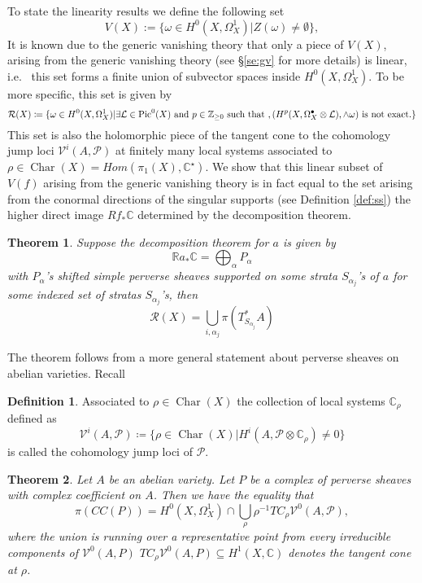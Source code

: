 \documentclass[11pt,reqno]{amsart}
\newtheorem{theorem}{Theorem}[section]
\newtheorem{alphtheorem}{Theorem}
\theoremstyle{definition}
\newtheorem{definition}[theorem]{Definition}
\theoremstyle{remark}
\theoremstyle{cited}
\theoremstyle{citeddef}
\DeclareMathOperator{\Char}{Char}
\def\Pic{{\rm Pic}}
\newcommand{\sL}{\mathcal{L}}
\newcommand{\sP}{\mathcal{P}}
\newcommand{\sR}{\mathcal{R}}
\newcommand\sV{{\mathcal V}}
\newcommand{\bbC}{\mathbb{C}}
\newcommand{\bbR}{\mathbb{R}}
\newcommand{\bbZ}{\mathbb{Z}}
\begin{document}
To state the linearity results we define
the following set
\[V(X):=\{ \omega\in H^0(X, \Omega_X^1) | Z(\omega)\neq \emptyset\},\]
It is known due to the generic vanishing theory
that only a piece of $V(X)$, arising from the generic vanishing theory (see \S \ref{se:gv} for more details) is linear, i.e.\
this set forms a finite union of subvector spaces inside $H^0(X, \Omega_X^1)$. To be more specific, this set is given by
\cite[p.\ 311]{Ara}
\[\sR(X)\coloneqq \{\omega\in H^0(X, \Omega_X^1)| \exists \sL\in \Pic^0(X) \text{ and } p\in \bbZ_{\geq 0} \text{ such that }, 
(H^{p}(X, \Omega_X^{\bullet}\otimes \sL), \wedge\omega) \text{ is not exact.}\}\]
This set is also the holomorphic piece of the tangent cone to the cohomology jump loci 
$\sV^i(A,\sP)$ at finitely many local systems associated to $\rho\in\Char(X) = Hom(\pi_1(X), \bbC^{\star})$.
We show that this linear subset of $V(f)$ arising from the generic vanishing theory is in fact 
equal to the set arising from the conormal directions of the singular supports (see Definition \ref{def:ss}) 
the higher direct image $Rf_*\bbC$ determined by the decomposition theorem. 
\begin{alphtheorem}
Suppose the decomposition theorem
for $a$ is given by
\[\bbR a_*\bbC = \bigoplus_{\alpha}P_{\alpha}\]
with $P_{\alpha}$'s shifted simple perverse sheaves supported on some strata $S_{\alpha_j}$'s of $a$ for some indexed set of stratas $S_{\alpha_j}$'s, then
\[\sR(X) =  \bigcup_{i,\alpha_j}\pi(T^*_{S_{\alpha_j}}A) \]
\label{thm:linearity}
\end{alphtheorem}
The theorem follows from a more general statement
about perverse sheaves on abelian varieties. Recall
\begin{definition}
Associated to $\rho\in \Char(X)$ the collection of local systems $\bbC_{\rho}$ defined as
\[\sV^i(A, \sP) \coloneqq \{\rho\in\Char(X)| H^i(A, \sP\otimes \bbC_{\rho}) \neq 0\}\]
is called the cohomology jump loci of $\sP$.
\label{def:cjl}
\end{definition}
\begin{theorem}
Let $A$ be an abelian variety. Let $P$ be a complex of perverse sheaves with complex coefficient on $A$. 
Then we have the equality that
$$\pi(CC(P)) = H^0(X, \Omega_X^1)\cap \bigcup_{\rho} \rho^{-1} TC_{\rho} \sV^0(A,\sP), $$
where the union is running over a representative point from every irreducible components of $\sV^0(A,P)$
$TC_{\rho} \sV^0(A,P) \subseteq H^1(X, \bbC)$ denotes the tangent cone at $\rho$. 
\label{thm:perverse}
\end{theorem}
\end{document}
